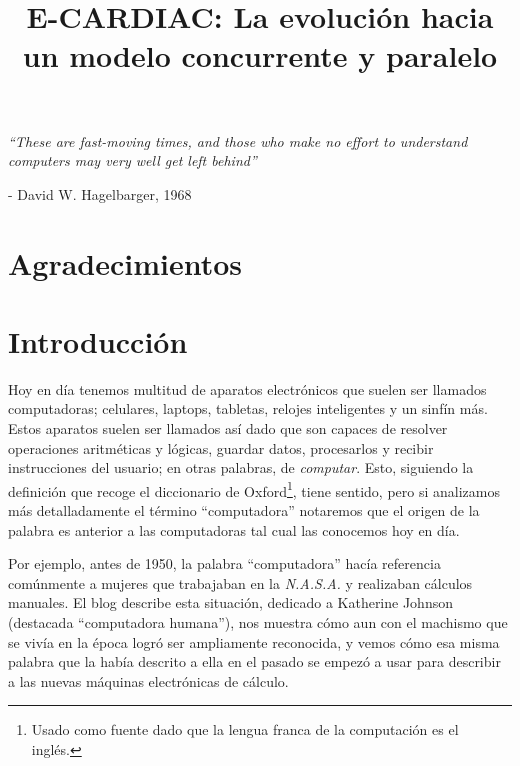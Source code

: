 \documentclass[letterpaper,12pt,oneside]{book}
\title{E-CARDIAC: La evolución hacia un modelo concurrente y paralelo}
\begin{document}
	\frontmatter
	\pagestyle{plain} %

    

\chapter*{}
\begin{flushright}%
  \emph{``These are fast-moving times, and those who make no effort to understand computers may very well get left behind''}
  
  
  - David W. Hagelbarger, 1968
\end{flushright}

\chapter*{Agradecimientos}


\chapter{Introducción}

	Hoy en día tenemos multitud de aparatos electrónicos que suelen ser llamados computadoras; celulares, laptops, tabletas, relojes inteligentes y un sinfín más. 
	Estos aparatos suelen ser llamados así dado que son capaces de resolver operaciones aritméticas y lógicas, guardar datos, procesarlos y recibir instrucciones del 
	usuario; en otras palabras, de \textit{computar}. Esto, siguiendo la definición
	que recoge el diccionario de Oxford\footnote{Usado como fuente dado que la lengua franca de la computación es el inglés.}, tiene sentido,
	pero si analizamos más detalladamente el término ``computadora''  notaremos que el origen de la palabra es anterior a las computadoras
	tal cual las conocemos hoy en día.
	
	Por ejemplo, antes de 1950, la palabra ``computadora''  hacía referencia comúnmente a mujeres
	que trabajaban en la \textit{N.A.S.A.} y realizaban cálculos manuales. El blog \cite{nasa_who_2020} describe esta situación, dedicado a Katherine Johnson (destacada ``computadora humana''), nos muestra cómo aun con el machismo que se vivía en la época logró ser ampliamente reconocida, y vemos cómo esa misma palabra que la había descrito a ella en el pasado
	se empezó a usar para describir a las nuevas máquinas electrónicas de cálculo.
\end{document}
